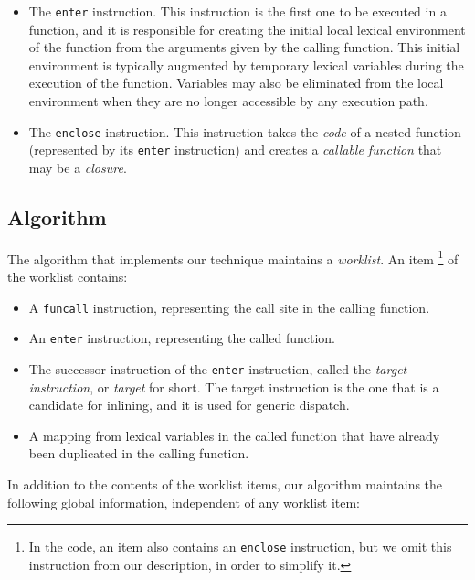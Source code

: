 \begin{itemize}
\item The \texttt{enter} instruction.  This instruction is the first
  one to be executed in a function, and it is responsible for creating
  the initial local lexical environment of the function from the
  arguments given by the calling function.  This initial environment
  is typically augmented by temporary lexical variables during the
  execution of the function.  Variables may also be eliminated from
  the local environment when they are no longer accessible by any
  execution path.
\item The \texttt{enclose} instruction.  This instruction takes the
  \emph{code} of a nested function (represented by its \texttt{enter}
  instruction) and creates a \emph{callable function} that may be a
  \emph{closure}.
\end{itemize}

\subsection{Algorithm}

The algorithm that implements our technique maintains a
\emph{worklist}.  An item%
\footnote{In the code, an item also contains an \texttt{enclose}
  instruction, but we omit this instruction from our description, in
  order to simplify it.}
of the worklist contains:

\begin{itemize}
\item A \texttt{funcall} instruction, representing the call site in the
  calling function.
\item An \texttt{enter} instruction, representing the called function.
\item The successor instruction of the \texttt{enter} instruction,
  called the \emph{target instruction}, or \emph{target} for short.
  The target instruction is the one that is a candidate for inlining, and it
  is used for generic dispatch.
\item A mapping from lexical variables in the called function that
  have already been duplicated in the calling function.
\end{itemize}

In addition to the contents of the worklist items, our algorithm
maintains the following global information, independent of any
worklist item:

